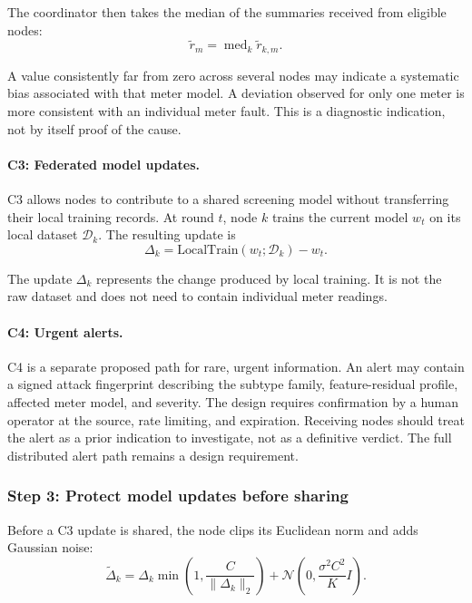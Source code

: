 \documentclass[11pt,a4paper]{article}
\begin{document}
The coordinator then takes the median of the summaries received from
eligible nodes:
\begin{equation}
\widetilde r_m
=
\operatorname{med}_{k}\widetilde r_{k,m}.
\label{eq:protocol-calibration-global}
\end{equation}

A value consistently far from zero across several nodes may indicate
a systematic bias associated with that meter model. A deviation
observed for only one meter is more consistent with an individual
meter fault. This is a diagnostic indication, not by itself proof of
the cause.

\paragraph{C3: Federated model updates.}

C3 allows nodes to contribute to a shared screening model without
transferring their local training records. At round $t$, node $k$
trains the current model $w_t$ on its local dataset $\mathcal D_k$.
The resulting update is
\begin{equation}
\Delta_k
=
\mathrm{LocalTrain}(w_t;\mathcal D_k)-w_t.
\label{eq:protocol-local-update}
\end{equation}

The update $\Delta_k$ represents the change produced by local training.
It is not the raw dataset and does not need to contain individual
meter readings.

\paragraph{C4: Urgent alerts.}

C4 is a separate proposed path for rare, urgent information. An alert
may contain a signed attack fingerprint describing the subtype family,
feature-residual profile, affected meter model, and severity. The
design requires confirmation by a human operator at the source,
rate limiting, and expiration. Receiving nodes should treat the alert
as a prior indication to investigate, not as a definitive verdict.
The full distributed alert path remains a design requirement.

\subsubsection{Step 3: Protect model updates before sharing}

Before a C3 update is shared, the node clips its Euclidean norm and
adds Gaussian noise:
\begin{equation}
\widetilde{\Delta}_k
=
\Delta_k
\min\!\left(1,\frac{C}{\|\Delta_k\|_2}\right)
+
\mathcal N\!\left(
0,\frac{\sigma^2 C^2}{K}I
\right).
\label{eq:protocol-protected-update}
\end{equation}
\end{document}
